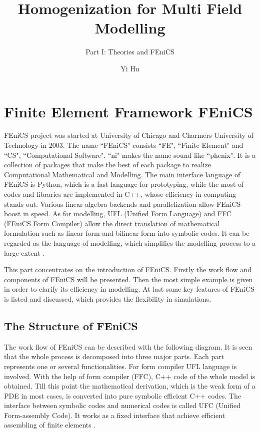 \documentclass[10pt,a4paper]{scrreprt}
\author{Yi Hu}
\title{Homogenization for Multi Field Modelling}
\subtitle{Part I: Theories and FEniCS}
\begin{document}
\chapter{Finite Element Framework FEniCS}

FEniCS project was started at University of Chicago and Charmers University of Technology in 2003. The name ``FEniCS" consists ``FE", ``Finite Element" and ``CS", ``Computational Software". ``ni" makes the name sound like ``phenix". It is a collection of packages that make the best of each package to realize Computational Mathematical and Modelling. The main interface language of FEniCS is Python, which is a fast language for prototyping, while the most of codes and libraries are implemented in C++, whose efficiency in computing stands out. Various linear algebra backends and parallelization allow FEniCS boost in speed. As for modelling, UFL (Unified Form Language) and FFC (FEniCS Form Compiler) allow the direct translation of mathematical formulation such as linear form and bilinear form into symbolic codes. It can be regarded as the language of modelling, which simplifies the modelling process to a large extent \citep{kirby2006compiler}.

This part concentrates on the introduction of FEniCS. Firstly the work flow and components of FEniCS will be presented. Then the most simple example is given in order to clarify its efficiency in modelling. At last some key features of FEniCS is listed and discussed, which provides the flexibility in simulations.

\section{The Structure of FEniCS}
The work flow of FEniCS can be described with the following diagram. It is seen that the whole process is decomposed into three major parts. Each part represents one or several functionalities. For form compiler UFL language is involved. With the help of form compiler (FFC), C++ code of the whole model is obtained. Till this point the mathematical derivation, which is the weak form of a PDE in most cases, is converted into pure symbolic efficient C++ codes. The interface between symbolic codes and numerical codes is called UFC (Unified Form-assembly Code). It works as a fixed interface that achieve efficient assembling of finite elements \citep{wells2012automated}.
\end{document}
